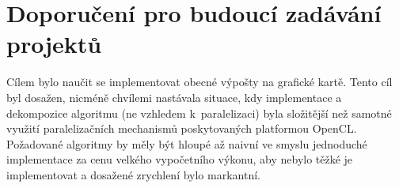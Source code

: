 \documentclass[11pt,a4paper]{article}
\begin{document}
\section{Doporučení pro budoucí zadávání projektů}
Cílem bylo naučit se implementovat obecné výpošty na grafické kartě. Tento cíl byl dosažen, nicméně chvílemi nastávala situace, kdy implementace a dekompozice algoritmu (ne vzhledem k~paralelizaci) byla složitější než samotné využití paralelizačních mechanismů poskytovaných platformou OpenCL. Požadované algoritmy by měly být hloupé až naivní ve smyslu jednoduché implementace za cenu velkého vypočetního výkonu, aby nebylo těžké je implementovat a dosažené zrychlení bylo markantní.
\end{document}
